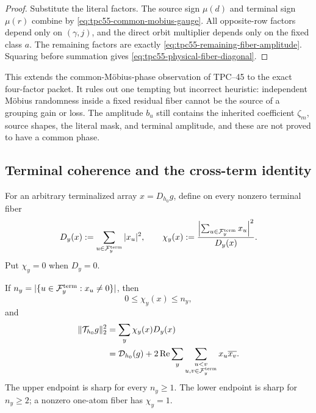 \begin{proof}
Substitute the literal factors.  The source sign \(\mu(d)\) and terminal
sign \(\mu(r)\) combine by
\eqref{eq:tpc55-common-mobius-gauge}.  All opposite-row factors depend
only on \((\gamma,j)\), and the direct orbit multiplier depends only on the
fixed class \(a\).  The remaining factors are exactly
\eqref{eq:tpc55-remaining-fiber-amplitude}.  Squaring before summation
gives \eqref{eq:tpc55-physical-fiber-diagonal}.
\end{proof}

This extends the common-M\"obius-phase observation of TPC--45 to the exact
four-factor packet.  It rules out one tempting but incorrect heuristic:
independent M\"obius randomness inside a fixed residual fiber cannot be the
source of a grouping gain or loss.  The amplitude \(b_u\) still contains
the inherited coefficient \(\zeta_m\), source shapes, the literal mask,
and terminal amplitude, and these are not proved to have a common phase.

\subsection{Terminal coherence and the cross-term identity}

For an arbitrary terminalized array \(x=D_{h_0}g\), define on every
nonzero terminal fiber
\begin{equation}
 D_y(x):=\sum_{u\in\mathcal F_y^{\rm term}}|x_u|^2,
 \qquad
 \chi_y(x):=
 \frac{\left|\sum_{u\in\mathcal F_y^{\rm term}}x_u\right|^2}{D_y(x)}.
 \label{eq:tpc55-fiber-coherent-gain}
\end{equation}
Put \(\chi_y=0\) when \(D_y=0\).

\begin{theorem}
\label{thm:tpc55-terminal-coherence}
If \(n_y=|\{u\in\mathcal F_y^{\rm term}:x_u\ne0\}|\), then
\begin{equation}
 0\le\chi_y(x)\le n_y,
 \label{eq:tpc55-coherence-range}
\end{equation}
and
\begin{align}
 \|\mathcal T_{h_0}g\|_2^2
 &=\sum_y\chi_y(x)D_y(x)
 \label{eq:tpc55-coherence-energy}\\
 &=\mathcal D_{h_0}(g)
 +2\operatorname{Re}
  \sum_y\sum_{\substack{u<v\\u,v\in\mathcal F_y^{\rm term}}}
 x_u\overline{x_v}.
 \label{eq:tpc55-exact-cross-term}
\end{align}
The upper endpoint is sharp for every \(n_y\ge1\).  The lower endpoint is
sharp for \(n_y\ge2\); a nonzero one-atom fiber has \(\chi_y=1\).
\end{theorem}

